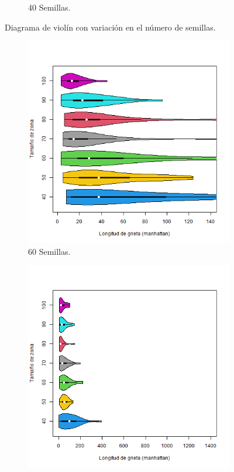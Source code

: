 \documentclass[a4paper]{article}
\begin{document}
\begin{figure}[h!]
\begin{subfigure}[b]{0.45\linewidth}
\caption{40 Semillas.}
\label{c2}
\end{subfigure}
\caption{Diagrama de violín con variación en el número de semillas.}
    \label{fig:4}
\end{figure}



\begin{figure}[h!]
    \centering
\begin{subfigure}[b]{0.45\linewidth}
\includegraphics[width=\linewidth]{p4_semillas60.png}
\caption{60 Semillas.}
\label{c4}
\end{subfigure}
\begin{subfigure}[b]{0.45\linewidth}
\includegraphics[width=\linewidth]{p4_semillas80.png}

\end{subfigure}
\end{figure}
\end{document}

